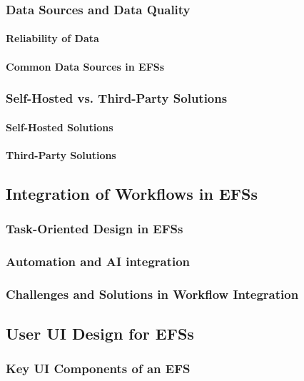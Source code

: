 \subsubsection{Data Sources and Data Quality}
\paragraph{Reliability of Data}
\paragraph{Common Data Sources in \aclp{EFS}}

\subsubsection{Self-Hosted vs. Third-Party Solutions}
\paragraph{Self-Hosted Solutions} %
\paragraph{Third-Party Solutions} %



\subsection{Integration of Workflows in \aclp{EFS}}

\subsubsection{Task-Oriented Design in \aclp{EFS}}
\subsubsection{Automation and \ac{AI} integration}
\subsubsection{Challenges and Solutions in Workflow Integration}

\subsection{User \ac{UI} Design for \aclp{EFS}} 
\subsubsection{Key \ac{UI} Components of an \acl{EFS}}
